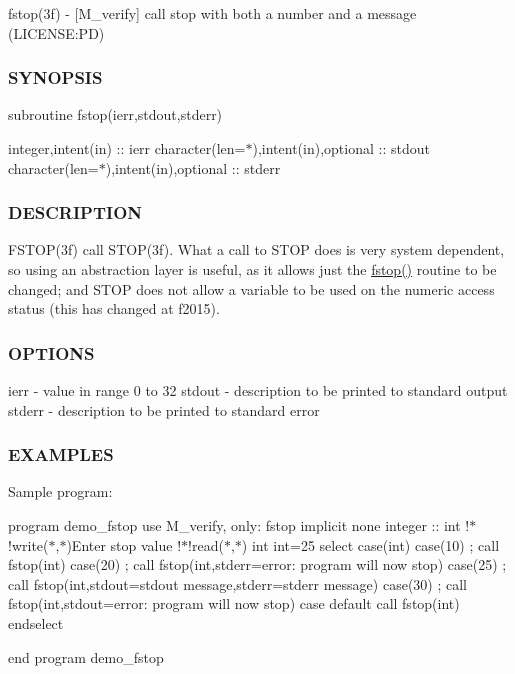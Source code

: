 fstop(3f) -\/ \mbox{[}M\+\_\+verify\mbox{]} call stop with both a number and a message (L\+I\+C\+E\+N\+SE\+:PD) \subsubsection*{S\+Y\+N\+O\+P\+S\+IS}

subroutine fstop(ierr,stdout,stderr)

integer,intent(in) \+:\+: ierr character(len=$\ast$),intent(in),optional \+:\+: stdout character(len=$\ast$),intent(in),optional \+:\+: stderr \subsubsection*{D\+E\+S\+C\+R\+I\+P\+T\+I\+ON}

F\+S\+T\+O\+P(3f) call S\+T\+O\+P(3f). What a call to S\+T\+OP does is very system dependent, so using an abstraction layer is useful, as it allows just the \mbox{\hyperlink{namespacem__verify_a2695833d468118d68918d6aeabab6d0b}{fstop()}} routine to be changed; and S\+T\+OP does not allow a variable to be used on the numeric access status (this has changed at f2015).

\subsubsection*{O\+P\+T\+I\+O\+NS}

ierr -\/ value in range 0 to 32 stdout -\/ description to be printed to standard output stderr -\/ description to be printed to standard error \subsubsection*{E\+X\+A\+M\+P\+L\+ES}

Sample program\+:

program demo\+\_\+fstop use M\+\_\+verify, only\+: fstop implicit none integer \+:\+: int !$\ast$!write($\ast$,$\ast$)\textquotesingle{}Enter stop value\textquotesingle{} !$\ast$!read($\ast$,$\ast$) int int=25 select case(int) case(10) ; call fstop(int) case(20) ; call fstop(int,stderr=\textquotesingle{}error\+: program will now stop\textquotesingle{}) case(25) ; call fstop(int,stdout=\textquotesingle{}stdout message\textquotesingle{},stderr=\textquotesingle{}stderr message\textquotesingle{}) case(30) ; call fstop(int,stdout=\textquotesingle{}error\+: program will now stop\textquotesingle{}) case default call fstop(int) endselect

end program demo\+\_\+fstop

